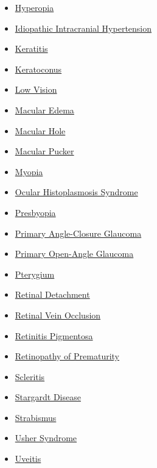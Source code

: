 \begin{itemize}[noitemsep]
  \item \hyperlink{sec:Hyperopia}{Hyperopia}
  \item \hyperlink{sec:Idiopathic Intracranial Hypertension}{Idiopathic Intracranial Hypertension}
  \item \hyperlink{sec:Keratitis}{Keratitis}
  \item \hyperlink{sec:Keratoconus}{Keratoconus}
  \item \hyperlink{sec:Low Vision}{Low Vision}
  \item \hyperlink{sec:Macular Edema}{Macular Edema}
  \item \hyperlink{sec:Macular Hole}{Macular Hole}
  \item \hyperlink{sec:Macular Pucker}{Macular Pucker}
  \item \hyperlink{sec:Myopia}{Myopia}
  \item \hyperlink{sec:Ocular Histoplasmosis Syndrome}{Ocular Histoplasmosis Syndrome}
  \item \hyperlink{sec:Presbyopia}{Presbyopia}
  \item \hyperlink{sec:Primary Angle-Closure Glaucoma}{Primary Angle-Closure Glaucoma}
  \item \hyperlink{sec:Primary Open-Angle Glaucoma}{Primary Open-Angle Glaucoma}
  \item \hyperlink{sec:Pterygium}{Pterygium}
  \item \hyperlink{sec:Retinal Detachment}{Retinal Detachment}
  \item \hyperlink{sec:Retinal Vein Occlusion}{Retinal Vein Occlusion}
  \item \hyperlink{sec:Retinitis Pigmentosa}{Retinitis Pigmentosa}
  \item \hyperlink{sec:Retinopathy of Prematurity}{Retinopathy of Prematurity}
  \item \hyperlink{sec:Scleritis}{Scleritis}
  \item \hyperlink{sec:Stargardt Disease}{Stargardt Disease}
  \item \hyperlink{sec:Strabismus}{Strabismus}
  \item \hyperlink{sec:Usher Syndrome}{Usher Syndrome}
  \item \hyperlink{sec:Uveitis}{Uveitis}
\end{itemize}

